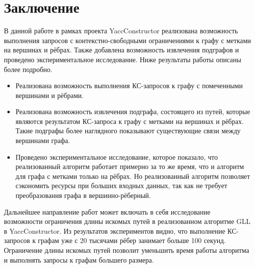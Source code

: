 \documentclass[14pt]{matmex-diploma}
\begin{document}
\section{Заключение}

В данной работе в рамках проекта YaccConstructor реализована возможность выполнения запросов с контекстно-свободными ограничениями к графу с метками на вершинах и рёбрах. Также добавлена возможность извлечения подграфов и проведено экспериментальное исследование. Ниже результаты работы описаны более подробно.

\begin{itemize}
    \item Реализована возможность выполнения КС-запросов к графу с помеченными вершинами и рёбрами.
    \item Реализована возможность извлечения подграфа, состоящего из путей, которые являются результатом КС-запроса к графу с метками на вершинах и рёбрах.  Такие подграфы более наглядного показывают существующие связи между вершинами графа.
    \item Проведено экспериментальное исследование, которое показало, что реализованный алгоритм работает примерно за то же время, что и алгоритм для графа с метками только на рёбрах. Но реализованный алгоритм позволяет сэкономить ресурсы при больших входных данных, так как не требует преобразования графа в вершинно-рёберный.
    
\end{itemize}

Дальнейшее направление работ может включать в себя исследование возможности ограничения длины искомых путей в реализованном алгоритме GLL в YaccConstructor. Из результатов экспериментов видно, что выполнение КС-запросов к графам уже с 20 тысячами рёбер занимает больше 100 секунд. Ограничение длины искомых путей позволит уменьшить время работы алгоритма и выполнять запросы к графам большего размера.

\setmonofont[Mapping=tex-text]{CMU Typewriter Text}


\end{document}
